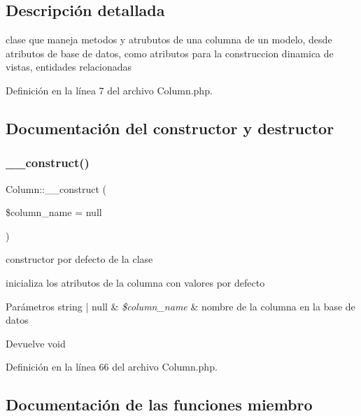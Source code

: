 \subsection{Descripción detallada}
clase que maneja metodos y atrubutos de una columna de un modelo, desde atributos de base de datos, como atributos para la construccion dinamica de vistas, entidades relacionadas 

Definición en la línea 7 del archivo Column.\+php.



\subsection{Documentación del constructor y destructor}
\mbox{\label{class_column_a85261de17287659e7bde7e1710fc5916}} 
\subsubsection{\texorpdfstring{\_\_construct()}{\_\_construct()}}
{\footnotesize\ttfamily Column\+::\+\_\+\+\_\+construct (\begin{DoxyParamCaption}\item[{}]{\$column\+\_\+name = {\ttfamily null} }\end{DoxyParamCaption})}

constructor por defecto de la clase

inicializa los atributos de la columna con valores por defecto


\begin{DoxyParams}[1]{Parámetros}
string | null & {\em \$column\+\_\+name} & nombre de la columna en la base de datos \\
\hline
\end{DoxyParams}
\begin{DoxyReturn}{Devuelve}
void 
\end{DoxyReturn}


Definición en la línea 66 del archivo Column.\+php.



\subsection{Documentación de las funciones miembro}
\mbox{\label{class_column_ac3da460a7c41cfc906f2ea3e8b37280f}} 
